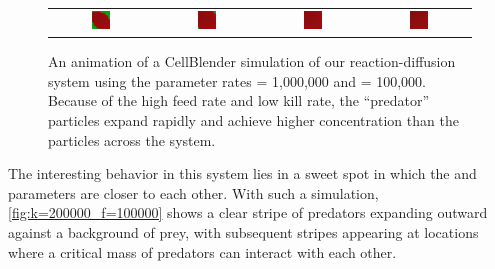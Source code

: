 \begin{figure}[h]
\begin{tabular}{c c c c}
\includegraphics[width = 0.2\textwidth]{../images/predator_prey_f1e6_d1e5_i4.png} & \includegraphics[width = 0.2\textwidth]{../images/../images/predator_prey_f1e6_d1e5_i5.png} & \includegraphics[width = 0.2\textwidth]{../images/../images/predator_prey_f1e6_d1e5_i6.png} & \includegraphics[width = 0.2\textwidth]{../images/../images/predator_prey_f1e6_d1e5_i7.png}
\end{tabular}
\caption{An animation of a CellBlender simulation of our reaction-diffusion system using the parameter rates  = 1,000,000 and  = 100,000. Because of the high feed rate and low kill rate, the ``predator''  particles expand rapidly and achieve higher concentration than the  particles across the system.}
\label{fig:k=100000_f=1000000}
\end{figure}

The interesting behavior in this system lies in a sweet spot in which the  and  parameters are closer to each other. With such a simulation, \autoref{fig:k=200000_f=100000} shows a clear stripe of predators expanding outward against a background of prey, with subsequent stripes appearing at locations where a critical mass of predators can interact with each other.

